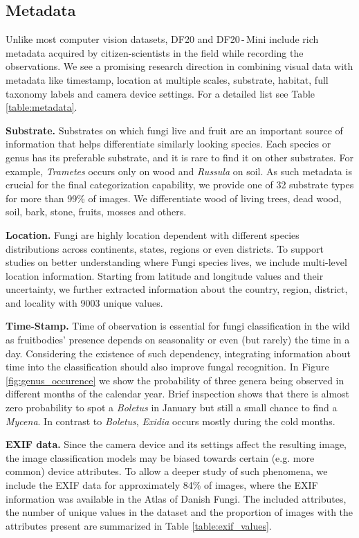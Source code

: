 \documentclass[10pt,twocolumn,letterpaper]{article}
\begin{document}
\subsection{Metadata}
Unlike most computer vision datasets, DF20 and DF20\,-\,Mini include rich metadata acquired by citizen-scientists in the field while recording the observations. We see a promising research direction in combining visual data with metadata like timestamp, location at multiple scales, substrate, habitat, full taxonomy labels and camera device settings. For a detailed list see Table\,\ref{table:metadata}. 

\textbf{Substrate.} Substrates on which fungi live and fruit are an important source of information that helps differentiate similarly looking species. Each species or genus has its preferable substrate, and it is rare to find it on other substrates. For example, \textit{Trametes} occurs only on wood and \textit{Russula} on soil. As such metadata is crucial for the final categorization capability, we provide one of 32 substrate types for more than 99\% of images. We differentiate wood of living trees, dead wood, soil, bark, stone, fruits, mosses and others. 

\textbf{Location.} Fungi are highly location dependent with different species distributions across continents, states, regions or even districts. To support studies on better understanding where Fungi species lives, we include multi-level location information. Starting from latitude and longitude values and their uncertainty, we further extracted information about the country, region, district, and locality with 9003 unique values. 

\textbf{Time-Stamp.} Time of observation is essential for fungi classification in the wild as fruitbodies' presence depends on  seasonality or even (but rarely) the time in a day. Considering the existence of such dependency, integrating information about time into the classification should also improve fungal recognition. In Figure\,\ref{fig:genus_occurence} we show the probability of three genera being observed in different months of the calendar year. Brief inspection shows that there is almost zero probability to spot a \textit{Boletus} in January but still a small chance to find a \textit{Mycena}. In contrast to \textit{Boletus}, \textit{Exidia} occurs mostly during the cold months.

\textbf{EXIF data.} Since the camera device and its settings affect the resulting image, the image classification models may be biased towards certain (e.g. more common) device attributes. To allow a deeper study of such phenomena, we include the EXIF data for approximately 84\% of images, where the EXIF information was available in the Atlas of Danish Fungi. The included attributes, the number of unique values in the dataset and the proportion of images with the attributes present are summarized in Table \ref{table:exif_values}. \\
\end{document}
